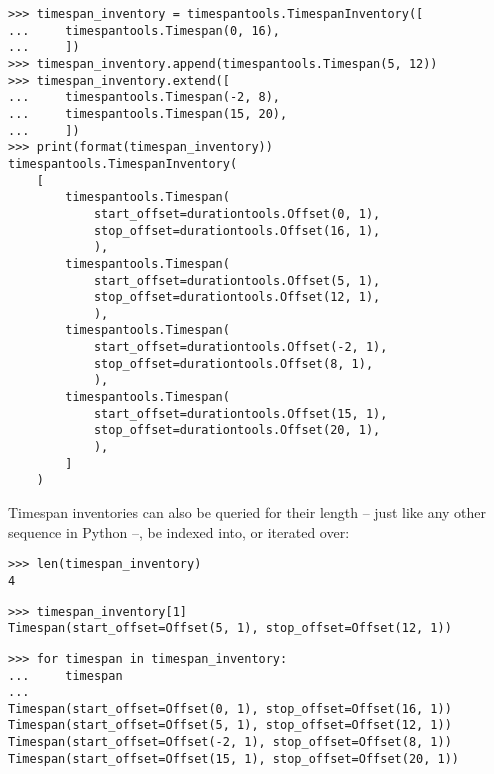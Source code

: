 \begin{singlespacing}
\vspace{-0.5\baselineskip}
\begin{lstlisting}
>>> timespan_inventory = timespantools.TimespanInventory([
...     timespantools.Timespan(0, 16),
...     ])
>>> timespan_inventory.append(timespantools.Timespan(5, 12))
>>> timespan_inventory.extend([
...     timespantools.Timespan(-2, 8),
...     timespantools.Timespan(15, 20),
...     ])
>>> print(format(timespan_inventory))
timespantools.TimespanInventory(
    [
        timespantools.Timespan(
            start_offset=durationtools.Offset(0, 1),
            stop_offset=durationtools.Offset(16, 1),
            ),
        timespantools.Timespan(
            start_offset=durationtools.Offset(5, 1),
            stop_offset=durationtools.Offset(12, 1),
            ),
        timespantools.Timespan(
            start_offset=durationtools.Offset(-2, 1),
            stop_offset=durationtools.Offset(8, 1),
            ),
        timespantools.Timespan(
            start_offset=durationtools.Offset(15, 1),
            stop_offset=durationtools.Offset(20, 1),
            ),
        ]
    )
\end{lstlisting}
\end{singlespacing}

\noindent Timespan inventories can also be queried for their length -- just
like any other sequence in Python --, be indexed into, or iterated over:

\begin{comment}
<abjad>
len(timespan_inventory)
timespan_inventory[1]
for timespan in timespan_inventory:
    timespan

</abjad>
\end{comment}

\begin{singlespacing}
\vspace{-0.5\baselineskip}
\begin{lstlisting}
>>> len(timespan_inventory)
4
\end{lstlisting}
\begin{lstlisting}
>>> timespan_inventory[1]
Timespan(start_offset=Offset(5, 1), stop_offset=Offset(12, 1))
\end{lstlisting}
\begin{lstlisting}
>>> for timespan in timespan_inventory:
...     timespan
...
Timespan(start_offset=Offset(0, 1), stop_offset=Offset(16, 1))
Timespan(start_offset=Offset(5, 1), stop_offset=Offset(12, 1))
Timespan(start_offset=Offset(-2, 1), stop_offset=Offset(8, 1))
Timespan(start_offset=Offset(15, 1), stop_offset=Offset(20, 1))
\end{lstlisting}
\end{singlespacing}


